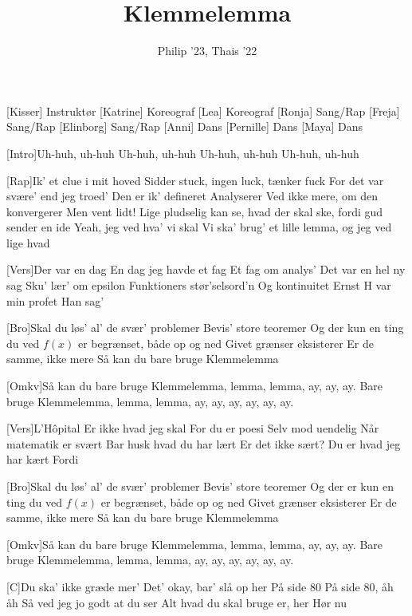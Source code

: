 \documentclass[a4paper,11pt]{article}
\title{Klemmelemma}
\author{Philip '23, Thais '22}
\begin{document}
\maketitle

\begin{roles}
[Kisser] Instruktør
[Katrine] Koreograf
[Lea] Koreograf
[Ronja] Sang/Rap
[Freja] Sang/Rap
[Elinborg] Sang/Rap
[Anni] Dans
[Pernille] Dans
[Maya] Dans
\end{roles}

\begin{song}
[Intro]Uh-huh, uh-huh
Uh-huh, uh-huh
Uh-huh, uh-huh
Uh-huh, uh-huh

    [Rap]Ik' et clue i mit hoved
Sidder stuck, ingen luck, tænker fuck
For det var svære' end jeg troed'
Den er ik' defineret 
Analyserer
Ved ikke mere, om den konvergerer
Men vent lidt!
Lige pludselig kan se, hvad der skal ske, fordi gud sender en ide
Yeah, jeg ved hva' vi skal
Vi ska' brug' et lille lemma, og jeg ved lige hvad 

    [Vers]Der var en dag
En dag jeg havde et fag
Et fag om analys'
Det var en hel ny sag
Sku' lær' om epsilon
Funktioners stør'selsord'n
Og kontinuitet
Ernst H var min profet
Han sag'

    [Bro]Skal du løs' al' de svær' problemer 
Bevis' store teoremer 
Og der kun en ting du ved
$f(x)$ er begrænset, både op og ned
Givet grænser eksisterer
Er de samme, ikke mere
Så kan du bare bruge Klemmelemma

    [Omkv]Så kan du bare bruge Klemmelemma, lemma, lemma, ay, ay, ay.
Bare bruge Klemmelemma, lemma, lemma, ay, ay, ay, ay, ay, ay.


    [Vers]L'Hôpital
Er ikke hvad jeg skal
For du er poesi
Selv mod uendelig
Når matematik er svært
Bar husk hvad du har lært 
Er det ikke sært?
Du er hvad jeg har kært 
Fordi

    [Bro]Skal du løs' al' de svær' problemer 
Bevis' store teoremer 
Og der er kun en ting du ved
$f(x)$ er begrænset, både op og ned
Givet grænser eksisterer
Er de samme, ikke mere
Så kan du bare bruge Klemmelemma

    [Omkv]Så kan du bare bruge Klemmelemma, lemma, lemma, ay, ay, ay.
Bare bruge Klemmelemma, lemma, lemma, ay, ay, ay, ay, ay, ay.

    [C]Du ska' ikke græde mer'
Det' okay, bar' slå op her
På side $80$
På side $80$, åh åh 
Så ved jeg jo godt at du ser
Alt hvad du skal bruge er, her
Hør nu


\end{song}
\end{document}
